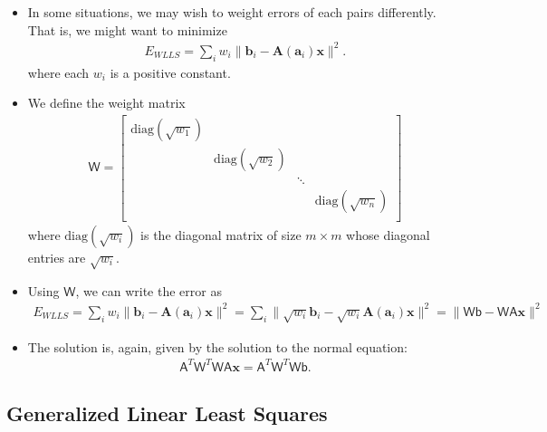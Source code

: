 \documentclass[10pt]{article}
\newcommand{\ve}[1]{\mathbf{#1}}
\newcommand{\msf}[1]{\mathsf{#1}}
\newcommand{\mrm}[1]{\mathrm{#1}}
\begin{document}
  \begin{itemize}
    \item In some situations, we may wish to weight errors of each
      pairs differently. That is, we might want to minimize
      \begin{align*}
        E_{WLLS} = \sum_{i} w_i \| \ve{b}_i - \ve{A}(\ve{a}_i) \ve{x} \|^2.
      \end{align*}      
      where each $w_i$ is a positive constant.
                
    \item We define the weight matrix
      \begin{align*}
        \msf{W} = \begin{bmatrix}
          \mrm{diag}(\sqrt{w_1}) & &  & \\
          & \mrm{diag}(\sqrt{w_2}) &  & \\
          & & \ddots & \\
          & & & \mrm{diag}(\sqrt{w_n}) \\
        \end{bmatrix}
      \end{align*}
      where $\mrm{diag}(\sqrt{w_i})$ is the diagonal
      matrix of size $m \times m$ whose diagonal 
      entries are $\sqrt{w_i}$.
      
    \item Using $\msf{W}$, we can write the error
      as
      \begin{align*}
        E_{WLLS} 
        = \sum_{i} w_i \| \ve{b}_i - \ve{A}(\ve{a}_i) \ve{x} \|^2
        = \sum_{i} \| \sqrt{w_i} \ve{b}_i - \sqrt{w_i} \ve{A}(\ve{a}_i) \ve{x} \|^2
        = \| \msf{W} \msf{b} - \msf{W} \msf{A} \ve{x} \|^2 
      \end{align*}
      
    \item The solution is, again, given by the solution to the normal
      equation:
      \begin{align*}
        \msf{A}^T \msf{W}^T \msf{W} \msf{A} \ve{x} 
        = \msf{A}^T \msf{W}^T \msf{W} \msf{b}.
      \end{align*}
  \end{itemize}
  
  \subsection{Generalized Linear Least Squares}
  
\end{document}
